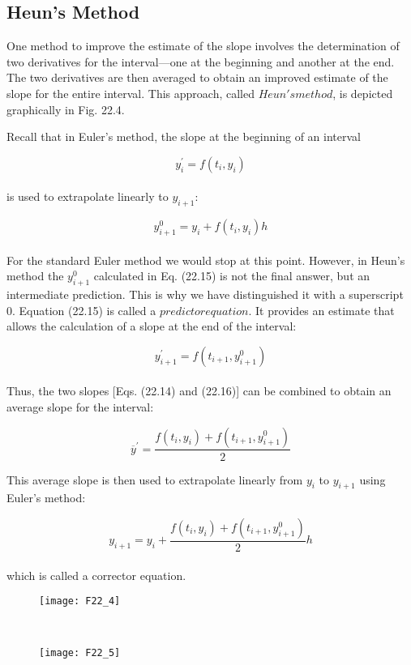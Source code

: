 \documentclass[../main.tex]{subfiles}
\begin{document}
\subsection{Heun's Method}
One method to improve the estimate of the slope involves the determination of two derivatives for the interval—one at the beginning and another at the end. The two derivatives are
then averaged to obtain an improved estimate of the slope for the entire interval. This approach, called $Heun's method$, is depicted graphically in Fig. 22.4.

Recall that in Euler's method, the slope at the beginning of an interval

\begin{equation}
\tag{22.14}
y^{'}_{i} = f(t_{i},y_{i})
\end{equation}\\
is used to extrapolate linearly to $y_{i+1}$:

\begin{equation}
\tag{22.15}
y^{0}_{i+1} = y_{i} + f( t_{i}, y_{i} )h
\end{equation}\\
For the standard Euler method we would stop at this point. However, in Heun's method the $y^{0}_{i+1}$ calculated in Eq. (22.15) is not the final answer, but an intermediate prediction. This is
why we have distinguished it with a superscript 0. Equation (22.15) is called a $predictor equation$. It provides an estimate that allows the calculation of a slope at the end of the interval:

\begin{equation}
\tag{22.16}
y^{'}_{i+1} = f( t_{i+1},y^{0}_{i+1})
\end{equation}\\
Thus, the two slopes [Eqs. (22.14) and (22.16)] can be combined to obtain an average slope
for the interval:


$$\overline{y}^{'} = \dfrac{f(t_{i},y_{i} ) + f(t_{i+1}, y^{0}_{i+1}) }{2}$$


This average slope is then used to extrapolate linearly from $y_{i}$ to $y_{i+1}$ using Euler's
method:

\begin{equation}
\tag{22.17}
y_{i+1} = y_{i} + \dfrac{f(t_{i},y_{i} ) + f(t_{i+1}, y^{0}_{i+1}) }{2}h
\end{equation}\\
which is called a corrector equation.\\
\begin{figure}[hbt!]
	\texttt{[image: F22\_4]}
	\label{F22.4}
\end{figure}\\
\pagebreak
\begin{figure}[hbt!]
	\texttt{[image: F22\_5]}
	\label{F22.5}
\end{figure}\\
\end{document}
